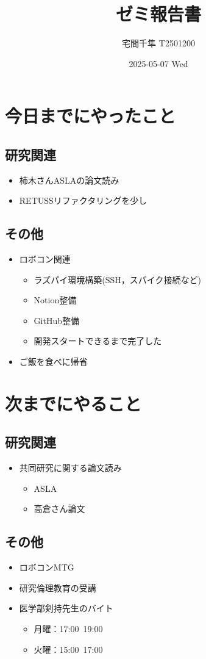 \documentclass[uplatex, onecolumn, 10pt]{jsarticle}
\begin{document}
\title{\vspace{-40mm}\bf{\LARGE{ゼミ報告書}}}
\author{\vspace{-40mm}宅間千隼 T2501200}
\date{2025-05-07 Wed}
\maketitle


\section{今日までにやったこと}

\subsection*{研究関連} 
\begin{itemize}
	\item 柿木さんASLAの論文読み
	\item RETUSSリファクタリングを少し
\end{itemize}

\subsection*{その他}
\begin{itemize}
	\item ロボコン関連
	\begin{itemize}
		\item ラズパイ環境構築(SSH，スパイク接続など)
		\item Notion整備
		\item GitHub整備
		\item 開発スタートできるまで完了した
	\end{itemize}
	\item ご飯を食べに帰省
\end{itemize}


\section{次までにやること}

\subsection*{研究関連}
\begin{itemize}
	\item 共同研究に関する論文読み
	\begin{itemize}
		\item ASLA
		\item 高倉さん論文
	\end{itemize}
\end{itemize}

\subsection*{その他}
\begin{itemize}
    \item ロボコンMTG
    \item 研究倫理教育の受講
    \item 医学部剣持先生のバイト
    \begin{itemize}
		\item 月曜：17:00~19:00
		\item 火曜：15:00~17:00
	\end{itemize}
\end{itemize}
\end{document}
